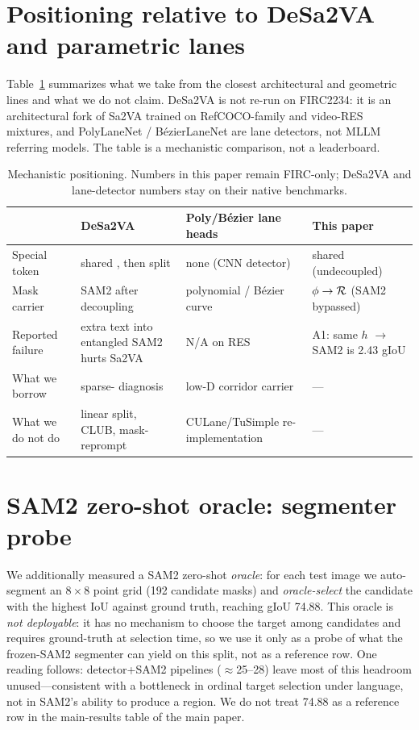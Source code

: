 \section{Positioning relative to DeSa2VA and parametric lanes}
\label{app:position}

Table~\ref{tab:pos} summarizes what we take from the closest architectural and geometric lines and what we do not claim.
DeSa2VA is not re-run on FIRC2234: it is an architectural fork of Sa2VA trained on RefCOCO-family and video-RES mixtures, and PolyLaneNet / B\'ezierLaneNet are lane detectors, not MLLM referring models.
The table is a mechanistic comparison, not a leaderboard.

\begin{table}[t]
\centering
\footnotesize
\setlength{\tabcolsep}{4pt}
\caption{Mechanistic positioning. Numbers in this paper remain FIRC-only; DeSa2VA and lane-detector numbers stay on their native benchmarks.}
\label{tab:pos}
\begin{tabularx}{\textwidth}{@{}lXXX@{}}
\toprule
 & DeSa2VA \citep{dang2025desa2va} & Poly/B\'ezier lane heads \citep{tabelini2021polylanenet,feng2022bezierlanenet} & This paper \\
\midrule
Special token & shared \Seg{}, then split & none (CNN detector) & shared \Seg{} (undecoupled) \\
Mask carrier & SAM2 after decoupling & polynomial / B\'ezier curve & $\phi \to \mathcal{R}$ (SAM2 bypassed) \\
Reported failure & extra text into entangled SAM2 hurts Sa2VA & N/A on RES & A1: same $h$ $\to$ SAM2 is 2.43 gIoU \\
What we borrow & sparse-\Seg{} diagnosis & low-D corridor carrier & --- \\
What we do not do & linear split, CLUB, mask-reprompt & CULane/TuSimple re-implementation & --- \\
\bottomrule
\end{tabularx}
\end{table}

\section{SAM2 zero-shot oracle: segmenter probe}
\label{app:oracle}

We additionally measured a SAM2 \citep{ravi2024sam2} zero-shot \emph{oracle}: for each test image we auto-segment an $8{\times}8$ point grid (192 candidate masks) and \emph{oracle-select} the candidate with the highest IoU against ground truth, reaching gIoU 74.88.
This oracle is \emph{not deployable}: it has no mechanism to choose the target among candidates and requires ground-truth at selection time, so we use it only as a probe of what the frozen-SAM2 segmenter can yield on this split, not as a reference row.
One reading follows: detector+SAM2 pipelines (${\approx}$25--28) leave most of this headroom unused---consistent with a bottleneck in ordinal target selection under language, not in SAM2's ability to produce a region.
We do not treat 74.88 as a reference row in the main-results table of the main paper.

